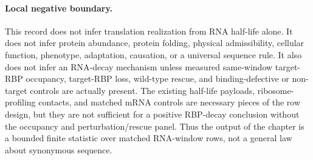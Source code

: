 \paragraph{Local negative boundary.}
This record does not infer translation realization from RNA half-life alone.  It does not infer protein abundance, protein folding, physical admissibility, cellular function, phenotype, adaptation, causation, or a universal sequence rule.  It also does not infer an RNA-decay mechanism unless measured same-window target-RBP occupancy, target-RBP loss, wild-type rescue, and binding-defective or non-target controls are actually present.  The existing half-life payloads, ribosome-profiling contacts, and matched mRNA controls are necessary pieces of the row design, but they are not sufficient for a positive RBP-decay conclusion without the occupancy and perturbation/rescue panel.  Thus the output of the chapter is a bounded finite statistic over matched RNA-window rows, not a general law about synonymous sequence.
